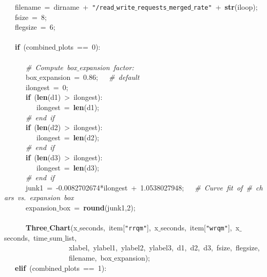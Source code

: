 \mbox{}\ \ \ filename\ =\ dirname\ +\ \texttt{"{}/read$\_$write$\_$requests$\_$merged$\_$rate"{}}\ +\ \textbf{str}(iloop); \\
\mbox{}\ \ \ fsize\ =\ 8; \\
\mbox{}\ \ \ flegsize\ =\ 6; \\
\mbox{}\ \ \  \\
\mbox{}\ \ \ \textbf{if}\ (combined$\_$plots\ ==\ 0): \\
\mbox{}\ \ \ \ \ \  \\
\mbox{}\ \ \ \ \ \ \textit{\#\ Compute\ box$\_$expansion\ factor:} \\
\mbox{}\ \ \ \ \ \ box$\_$expansion\ =\ 0.86;\ \ \ \textit{\#\ default} \\
\mbox{}\ \ \ \ \ \ ilongest\ =\ 0; \\
\mbox{}\ \ \ \ \ \ \textbf{if}\ (\textbf{len}(d1)\ \textgreater{}\ ilongest): \\
\mbox{}\ \ \ \ \ \ \ \ \ ilongest\ =\ \textbf{len}(d1); \\
\mbox{}\ \ \ \ \ \ \textit{\#\ end\ if} \\
\mbox{}\ \ \ \ \ \ \textbf{if}\ (\textbf{len}(d2)\ \textgreater{}\ ilongest): \\
\mbox{}\ \ \ \ \ \ \ \ \ ilongest\ =\ \textbf{len}(d2); \\
\mbox{}\ \ \ \ \ \ \textit{\#\ end\ if} \\
\mbox{}\ \ \ \ \ \ \textbf{if}\ (\textbf{len}(d3)\ \textgreater{}\ ilongest): \\
\mbox{}\ \ \ \ \ \ \ \ \ ilongest\ =\ \textbf{len}(d3); \\
\mbox{}\ \ \ \ \ \ \textit{\#\ end\ if} \\
\mbox{}\ \ \ \ \ \ junk1\ =\ -0.0082702674*ilongest\ +\ 1.0538027948;\ \ \ \textit{\#\ Curve\ fit\ of\ \#\ chars\ vs.\ expansion\ box} \\
\mbox{}\ \ \ \ \ \ expansion$\_$box\ =\ \textbf{round}(junk1,2); \\
\mbox{}\ \ \ \ \ \  \\
\mbox{}\ \ \ \ \ \ \textbf{Three$\_$Chart}(x$\_$seconds,\ item[\texttt{"{}rrqm"{}}],\ x$\_$seconds,\ item[\texttt{"{}wrqm"{}}],\ x$\_$seconds,\ time$\_$sum$\_$list, \\
\mbox{}\ \ \ \ \ \ \ \ \ \ \ \ \ \ \ \ \ \ xlabel,\ ylabel1,\ ylabel2,\ ylabel3,\ d1,\ d2,\ d3,\ fsize,\ flegsize, \\
\mbox{}\ \ \ \ \ \ \ \ \ \ \ \ \ \ \ \ \ \ filename,\ box$\_$expansion); \\
\mbox{}\ \ \ \textbf{elif}\ (combined$\_$plots\ ==\ 1): \\
